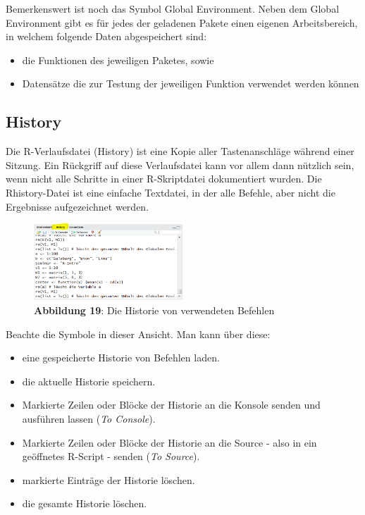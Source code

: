 \documentclass[]{article}
\providecommand{\tightlist}{%
  \setlength{\itemsep}{0pt}\setlength{\parskip}{0pt}}
\begin{document}
Bemerkenswert ist noch das Symbol Global Environment. Neben dem Global
Environment gibt es für jedes der geladenen Pakete einen eigenen
Arbeitsbereich, in welchem folgende Daten abgespeichert sind:

\begin{itemize}
\tightlist
\item
  die Funktionen des jeweiligen Paketes, sowie
\item
  Datensätze die zur Testung der jeweiligen Funktion verwendet werden
  können
\end{itemize}

\subsection*{History}\label{history}

Die R-Verlaufsdatei (History) ist eine Kopie aller Tastenanschläge
während einer Sitzung. Ein Rückgriff auf diese Verlaufsdatei kann vor
allem dann nützlich sein, wenn nicht alle Schritte in einer
R-Skriptdatei dokumentiert wurden. Die Rhistory-Datei ist eine einfache
Textdatei, in der alle Befehle, aber nicht die Ergebnisse aufgezeichnet
werden.

\begin{figure}
\centering
\includegraphics[width=0.50000\textwidth]{Images/04_History.PNG}
\caption{\textbf{Abbildung 19}: Die Historie von verwendeten Befehlen}
\end{figure}

Beachte die Symbole in dieser Ansicht. Man kann über diese:

\begin{itemize}
\tightlist
\item
  eine gespeicherte Historie von Befehlen laden.
\item
  die aktuelle Historie speichern.
\item
  Markierte Zeilen oder Blöcke der Historie an die Konsole senden und
  ausführen lassen (\emph{To Console}).
\item
  Markierte Zeilen oder Blöcke der Historie an die Source - also in ein
  geöffnetes R-Script - senden (\emph{To Source}).
\item
  markierte Einträge der Historie löschen.
\item
  die gesamte Historie löschen.
\end{itemize}
\end{document}
